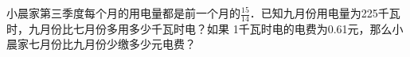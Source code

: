 
小晨家第三季度每个月的用电量都是前一个月的$\frac{15}{14}$．已知九月份用电量为225千瓦时，九月份比七月份多用多少千瓦时电？如果 1千瓦时电的电费为0.61元，那么小晨家七月份比九月份少缴多少元电费？

